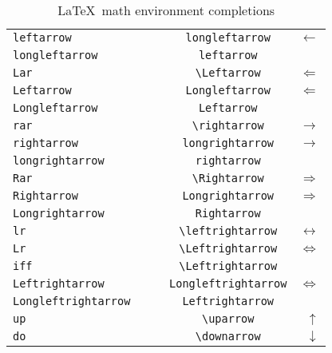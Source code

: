 \documentclass[a4paper,11pt]{scrartcl}
\numberwithin{equation}{section}
\begin{document}
\begin{table}[tb]
\begin{center}
\begin{tabular}{lcr}
    \verb|leftarrow|                           &    \verb|longleftarrow|                      &    $\longleftarrow$  \\
    \verb|longleftarrow|                       &    \verb|leftarrow|                          &    $\mbox{}$  \\
    \verb|Lar|                                 &    \verb|\Leftarrow|                         &    $\Leftarrow$  \\
    \verb|Leftarrow|                           &    \verb|Longleftarrow|                      &    $\Longleftarrow$  \\
    \verb|Longleftarrow|                       &    \verb|Leftarrow|                          &    $\mbox{}$  \\
    \verb|rar|                                 &    \verb|\rightarrow|                        &    $\rightarrow$  \\
    \verb|rightarrow|                          &    \verb|longrightarrow|                     &    $\longrightarrow$  \\
    \verb|longrightarrow|                      &    \verb|rightarrow|                         &    $\mbox{}$  \\
    \verb|Rar|                                 &    \verb|\Rightarrow|                        &    $\Rightarrow$  \\
    \verb|Rightarrow|                          &    \verb|Longrightarrow|                     &    $\Longrightarrow$  \\
    \verb|Longrightarrow|                      &    \verb|Rightarrow|                         &    $\mbox{}$  \\
    \verb|lr|                                  &    \verb|\leftrightarrow|                    &    $\leftrightarrow$  \\
    \verb|Lr|                                  &    \verb|\Leftrightarrow|                    &    $\Leftrightarrow$  \\
    \verb|iff|                                 &    \verb|\Leftrightarrow|                    &    \mbox{}  \\
    \verb|Leftrightarrow|                      &    \verb|Longleftrightarrow|                 &    $\Longleftrightarrow$  \\
    \verb|Longleftrightarrow    |              &    \verb|  Leftrightarrow  |                 &    $\mbox{}$  \\
    \verb|up|                                  &    \verb|\uparrow|                           &    $\uparrow$  \\
    \verb|do|                                  &    \verb|\downarrow|                         &    $\downarrow$  \\
    \hline
    \end{tabular}
  \end{center}
\caption{\LaTeX \ math environment completions \smiley}
\end{table}
\end{document}
